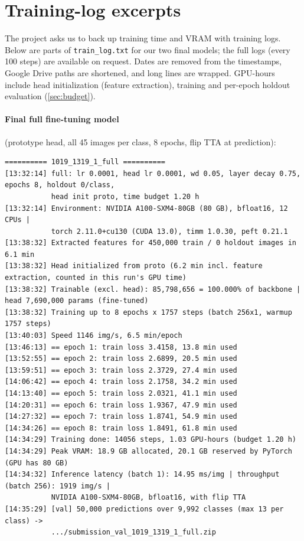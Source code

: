 \clearpage
\onecolumn
\appendix

\section{Training-log excerpts}
\label{sec:logs}

The project asks us to back up training time and VRAM with training logs.
Below are parts of \texttt{train\_log.txt} for our two final models; the full logs (every 100 steps) are available on request.
Dates are removed from the timestamps, Google Drive paths are shortened, and long lines are wrapped.
GPU-hours include head initialization (feature extraction), training and per-epoch holdout evaluation (\cref{sec:budget}).

\paragraph{Final full fine-tuning model} (prototype head, all 45 images per class, 8 epochs, flip TTA at prediction):
{\scriptsize
\begin{verbatim}
========== 1019_1319_1_full ==========
[13:32:14] full: lr 0.0001, head lr 0.0001, wd 0.05, layer decay 0.75, epochs 8, holdout 0/class,
           head init proto, time budget 1.20 h
[13:32:14] Environment: NVIDIA A100-SXM4-80GB (80 GB), bfloat16, 12 CPUs |
           torch 2.11.0+cu130 (CUDA 13.0), timm 1.0.30, peft 0.21.1
[13:38:32] Extracted features for 450,000 train / 0 holdout images in 6.1 min
[13:38:32] Head initialized from proto (6.2 min incl. feature extraction, counted in this run's GPU time)
[13:38:32] Trainable (excl. head): 85,798,656 = 100.000% of backbone | head 7,690,000 params (fine-tuned)
[13:38:32] Training up to 8 epochs x 1757 steps (batch 256x1, warmup 1757 steps)
[13:40:03] Speed 1146 img/s, 6.5 min/epoch
[13:46:13] == epoch 1: train loss 3.4158, 13.8 min used
[13:52:55] == epoch 2: train loss 2.6899, 20.5 min used
[13:59:51] == epoch 3: train loss 2.3729, 27.4 min used
[14:06:42] == epoch 4: train loss 2.1758, 34.2 min used
[14:13:40] == epoch 5: train loss 2.0321, 41.1 min used
[14:20:31] == epoch 6: train loss 1.9367, 47.9 min used
[14:27:32] == epoch 7: train loss 1.8741, 54.9 min used
[14:34:26] == epoch 8: train loss 1.8491, 61.8 min used
[14:34:29] Training done: 14056 steps, 1.03 GPU-hours (budget 1.20 h)
[14:34:29] Peak VRAM: 18.9 GB allocated, 20.1 GB reserved by PyTorch (GPU has 80 GB)
[14:34:32] Inference latency (batch 1): 14.95 ms/img | throughput (batch 256): 1919 img/s |
           NVIDIA A100-SXM4-80GB, bfloat16, with flip TTA
[14:35:29] [val] 50,000 predictions over 9,992 classes (max 13 per class) ->
           .../submission_val_1019_1319_1_full.zip
\end{verbatim}
}

